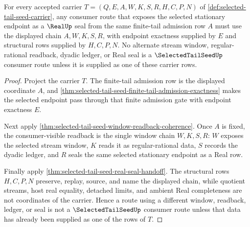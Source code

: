 \begin{theorem}
\label{thm:selected-tail-seed-tail-window-determinacy}
For every accepted carrier $T=(Q,E,A,W,K,S,R,H,C,P,N)$ of \autoref{def:selected-tail-seed-carrier}, any consumer route that exposes the selected stationary endpoint as a $\RealUp$ seal from the same finite-tail admission row $A$ must use the displayed chain $A,W,K,S,R$, with endpoint exactness supplied by $E$ and structural rows supplied by $H,C,P,N$. No alternate stream window, regular-rational readback, dyadic ledger, or Real seal is a $\SelectedTailSeedUp$ consumer route unless it is supplied as one of these carrier rows.
\end{theorem}
\begin{proof}
Project the carrier $T$. The finite-tail admission row is the displayed coordinate $A$, and \autoref{thm:selected-tail-seed-finite-tail-admission-exactness} makes the selected endpoint pass through that finite admission gate with endpoint exactness $E$.

Next apply \autoref{thm:selected-tail-seed-window-readback-coherence}. Once $A$ is fixed, the consumer-visible readback is the single window chain $W,K,S,R$: $W$ exposes the selected stream window, $K$ reads it as regular-rational data, $S$ records the dyadic ledger, and $R$ seals the same selected stationary endpoint as a Real row.

Finally apply \autoref{thm:selected-tail-seed-real-seal-handoff}. The structural rows $H,C,P,N$ preserve, replay, source, and name the displayed chain, while quotient streams, host real equality, detached limits, and ambient Real completeness are not coordinates of the carrier. Hence a route using a different window, readback, ledger, or seal is not a $\SelectedTailSeedUp$ consumer route unless that data has already been supplied as one of the rows of $T$.
\end{proof}


